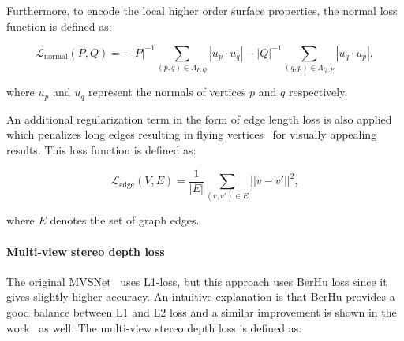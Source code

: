 \noindent Furthermore, to encode the local higher order surface properties, the normal loss function is defined as:

\begin{footnotesize}
\begin{equation}
\mathcal{L}_{\text{normal}}(P, Q) = -|P|^{-1}\!\!\!\!\!\!\!\! \sum_{(p, q) \in \Lambda_{P,Q}}\!\!\!\!\!\!\!\!{|u_p \cdot u_q|} - |Q|^{-1}\!\!\!\!\!\!\!\! \sum_{(q, p) \in \Lambda_{Q,P}}\!\!\!\!\!\!\!\!{|u_q \cdot u_p|},
\end{equation}
\end{footnotesize}

\noindent where $u_p$ and $u_q$ represent the normals of vertices $p$ and $q$ respectively.  

An additional regularization term in the form of edge length loss is also applied which penalizes long edges resulting in flying vertices~\cite{wang2018pixel2mesh} for visually appealing results. This loss function is defined as:

\begin{equation}
\mathcal{L}_{\text{edge}}(V, E) = \frac{1}{|E|} \sum_{(v,v') \in E}{||v - v'||^2},
\end{equation}

\noindent where $E$ denotes the set of graph edges.


\paragraph{Multi-view stereo depth loss}\vspace{-4mm}
The original MVSNet~\cite{yao2018mvsnet} uses L1-loss, but this approach uses BerHu loss since it gives slightly higher accuracy.
An intuitive explanation is that BerHu provides a good balance between L1 and L2 loss and a similar improvement is shown in the work~\cite{laina2016deeper} as well.
The multi-view stereo depth loss is defined as:

